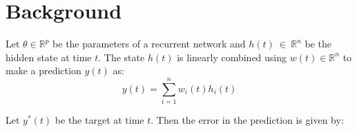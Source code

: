 \documentclass{article}
\begin{document}


\section{Background}
Let $\theta \in \mathbb R^{p} $ be the parameters of a recurrent network and $h(t)~\in~\mathbb R^n$ be the hidden state at time $t$. The state $h(t)$ is linearly combined using $w(t) \in \mathbb R^n $ to make a prediction $y(t)$ as:
\begin{equation}
y(t) = \sum_{i=1}^{n} w_i(t)h_i(t) 
\end{equation}


Let $y^*(t)$ be the target at time $t$. Then the error in the prediction is given by:
\end{document}
